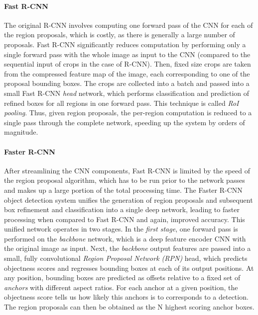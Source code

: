 \paragraph{Fast R-CNN}
The original R-CNN involves computing one forward pass of the CNN for each of the region proposals,
which is costly, as there is generally a large number of proposals.
Fast R-CNN \cite{FastRCNN} significantly reduces computation by performing only a single forward pass with the whole image
as input to the CNN (compared to the sequential input of crops in the case of R-CNN).
Then, fixed size crops are taken from the compressed feature map of the image,
each corresponding to one of the proposal bounding boxes.
The crops are collected into a batch and passed into a small Fast R-CNN
\emph{head} network, which performs classification and prediction of refined boxes for all regions in one forward pass.
This technique is called \emph{RoI pooling}. %
Thus, given region proposals, the per-region computation is reduced to a single pass through the complete network,
speeding up the system by orders of magnitude. %

\paragraph{Faster R-CNN}
After streamlining the CNN components, Fast R-CNN is limited by the speed of the region proposal
algorithm, which has to be run prior to the network passes and makes up a large portion of the total
processing time.
The Faster R-CNN object detection system \cite{FasterRCNN} unifies the generation of region proposals and subsequent box refinement and
classification into a single deep network, leading to faster processing when compared to Fast R-CNN
and again, improved accuracy.
This unified network operates in two stages.
In the \emph{first stage}, one forward pass is performed on the \emph{backbone} network,
which is a deep feature encoder CNN with the original image as input.
Next, the \emph{backbone} output features are passed into a small, fully convolutional \emph{Region Proposal Network (RPN)} head, which
predicts objectness scores and regresses bounding boxes at each of its output positions.
At any position, bounding boxes are predicted as offsets relative to a fixed set of \emph{anchors} with different
aspect ratios.
For each anchor at a given position, the objectness score tells us how likely this anchors is to corresponds to a detection.
The region proposals can then be obtained as the N highest scoring anchor boxes.

